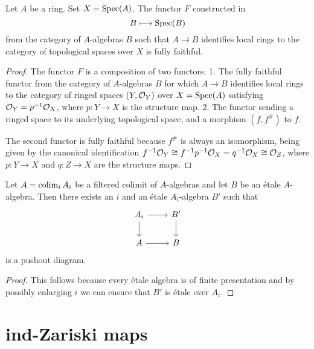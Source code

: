 \begin{lemma}{\cite[\href{https://stacks.math.columbia.edu/tag/096L}{Tag 096L}]{stacks-project}}
  \label{thm:identifies-local-ring-to-top-fully-faithful}
  Let $A$ be a ring. Set $X = \operatorname{Spec} (A)$. The functor \(F\) constructed in 
  \[
  B \longmapsto \operatorname{Spec} (B)
  \]
  from the category of $A$-algebras $B$ such that $A \to B$ identifies local rings to the category of topological spaces over $X$ is fully faithful.
\end{lemma}

\begin{proof}
The functor \(F\) is a composition of two functors:
1. The fully faithful functor from the category of \(A\)-algebras \(B\) for which \(A \to B\) identifies local rings to the category of ringed spaces \((Y, {\mathcal{O}}_Y)\) over \(X = \operatorname{Spec}(A)\) satisfying \({\mathcal{O}}_Y = p^{-1}{\mathcal{O}}_X\), where \(p: Y \to X\) is the structure map.
2. The functor sending a ringed space to its underlying topological space, and a morphism \((f, f^\#)\) to \(f\).

The second functor is fully faithful because \(f^\#\) is always an isomorphism, being given by the canonical identification \(f^{-1}{\mathcal{O}}_Y \cong f^{-1}p^{-1}{\mathcal{O}}_X = q^{-1}{\mathcal{O}}_X \cong {\mathcal{O}}_Z\), where \(p: Y \to X\) and \(q: Z \to X\) are the structure maps.
\end{proof}

\begin{lemma}
    Let $A = \operatorname{colim}_i A_i$ be a filtered colimit of $A$-algebras and let $B$ be an étale $A$-algebra. Then
    there exists an $i$ and an étale $A_i$-algebra $B'$ such that
    \[
    \begin{tikzcd}
        A_i \arrow{r} \arrow{d} & B' \arrow{d} \\
        A \arrow{r} & B
    \end{tikzcd}
    \] is a pushout diagram.
    \label{lemma:etale-ind-spreads}
\end{lemma}

\begin{proof}
    This follows because every étale algebra is of finite presentation and by possibly enlarging $i$ we can ensure
    that $B'$ is étale over $A_i$.
\end{proof}

\section{ind-Zariski maps}

